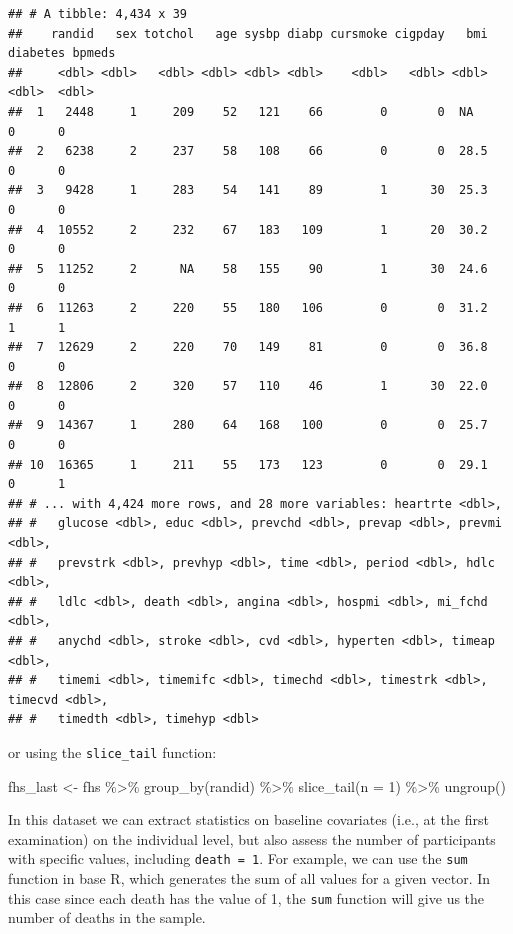 \documentclass[
]{book}
\newenvironment{Shaded}{\begin{snugshade}}{\end{snugshade}}
\newcommand{\AttributeTok}[1]{\textcolor[rgb]{0.77,0.63,0.00}{#1}}
\newcommand{\DecValTok}[1]{\textcolor[rgb]{0.00,0.00,0.81}{#1}}
\newcommand{\FunctionTok}[1]{\textcolor[rgb]{0.00,0.00,0.00}{#1}}
\newcommand{\NormalTok}[1]{#1}
\newcommand{\OtherTok}[1]{\textcolor[rgb]{0.56,0.35,0.01}{#1}}
\newcommand{\SpecialCharTok}[1]{\textcolor[rgb]{0.00,0.00,0.00}{#1}}
\begin{document}
\begin{verbatim}
## # A tibble: 4,434 x 39
##    randid   sex totchol   age sysbp diabp cursmoke cigpday   bmi diabetes bpmeds
##     <dbl> <dbl>   <dbl> <dbl> <dbl> <dbl>    <dbl>   <dbl> <dbl>    <dbl>  <dbl>
##  1   2448     1     209    52   121    66        0       0  NA          0      0
##  2   6238     2     237    58   108    66        0       0  28.5        0      0
##  3   9428     1     283    54   141    89        1      30  25.3        0      0
##  4  10552     2     232    67   183   109        1      20  30.2        0      0
##  5  11252     2      NA    58   155    90        1      30  24.6        0      0
##  6  11263     2     220    55   180   106        0       0  31.2        1      1
##  7  12629     2     220    70   149    81        0       0  36.8        0      0
##  8  12806     2     320    57   110    46        1      30  22.0        0      0
##  9  14367     1     280    64   168   100        0       0  25.7        0      0
## 10  16365     1     211    55   173   123        0       0  29.1        0      1
## # ... with 4,424 more rows, and 28 more variables: heartrte <dbl>,
## #   glucose <dbl>, educ <dbl>, prevchd <dbl>, prevap <dbl>, prevmi <dbl>,
## #   prevstrk <dbl>, prevhyp <dbl>, time <dbl>, period <dbl>, hdlc <dbl>,
## #   ldlc <dbl>, death <dbl>, angina <dbl>, hospmi <dbl>, mi_fchd <dbl>,
## #   anychd <dbl>, stroke <dbl>, cvd <dbl>, hyperten <dbl>, timeap <dbl>,
## #   timemi <dbl>, timemifc <dbl>, timechd <dbl>, timestrk <dbl>, timecvd <dbl>,
## #   timedth <dbl>, timehyp <dbl>
\end{verbatim}

or using the \texttt{slice\_tail} function:

\begin{Shaded}
\begin{Highlighting}[]
\NormalTok{fhs\_last }\OtherTok{\textless{}{-}}\NormalTok{ fhs }\SpecialCharTok{\%\textgreater{}\%} 
  \FunctionTok{group\_by}\NormalTok{(randid) }\SpecialCharTok{\%\textgreater{}\%} 
  \FunctionTok{slice\_tail}\NormalTok{(}\AttributeTok{n =} \DecValTok{1}\NormalTok{) }\SpecialCharTok{\%\textgreater{}\%} 
  \FunctionTok{ungroup}\NormalTok{()}
\end{Highlighting}
\end{Shaded}

In this dataset we can extract statistics on baseline covariates (i.e., at the first examination) on the individual level, but also assess the number of participants with specific values, including \texttt{death\ =\ 1}. For example, we can use the \texttt{sum} function in base R, which generates the sum of all values for a given vector. In this case since each death has the value of 1, the \texttt{sum} function will give us the number of deaths in the sample.
\end{document}
